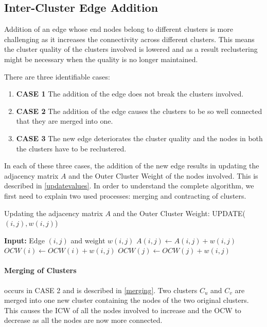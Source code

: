 \subsection{Inter-Cluster Edge Addition}

Addition of an edge whose end nodes belong to different clusters is more challenging as it increases the connectivity across different clusters. This means the cluster quality of the clusters involved is lowered and as a result reclustering might be necessary when the quality is no longer maintained. 

There are three identifiable cases:

\begin{enumerate}
	\item \textbf{CASE 1} The addition of the edge does not break the clusters involved.
	\item \textbf{CASE 2} The addition of the edge causes the clusters to be so well connected that they are merged into one.
	\item \textbf{CASE 3} The new edge deteriorates the cluster quality and the nodes in both the clusters have to be reclustered.
\end{enumerate}

In each of these three cases, the addition of the new edge results in updating the adjacency matrix $A$ and the Outer Cluster Weight of the nodes involved. This is described in \autoref{updatevalues}. In order to understand the complete algorithm, we first need to explain two used processes: merging and contracting of clusters.

\begin{algorithm}
\caption{Updating the adjacency matrix $A$ and the Outer Cluster Weight: UPDATE($(i,j),w(i,j)$)}
\label{updatevalues}
\begin{algorithmic}
\STATE \textbf{Input:} Edge $(i,j)$ and weight $w(i,j)$
\STATE $A(i,j) \leftarrow A(i,j) + w(i,j)$
\STATE $OCW(i) \leftarrow OCW(i) + w(i,j)$
\STATE $OCW(j) \leftarrow OCW(j) + w(i,j)$
\end{algorithmic}
\end{algorithm}

\paragraph{Merging of Clusters} occurs in CASE 2 and is described in \autoref{merging}. Two clusters $C_u$ and $C_v$ are merged into one new cluster containing the nodes of the two original clusters. This causes the ICW of all the nodes involved to increase and the OCW to decrease as all the nodes are now more connected.

